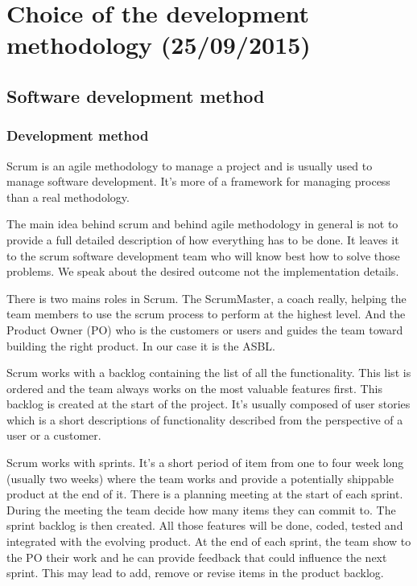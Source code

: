 \section{Choice of the development methodology (25/09/2015)}

\subsection{Software development method}

\subsubsection{Development method}
Scrum is an agile methodology to manage a project and is usually used to manage software development. It's more of a framework for managing process than a real methodology.\newline

The main idea behind scrum and behind agile methodology in general is not to provide a full detailed description of how everything has to be done. It leaves it to the scrum software development team who will know best how to solve those problems. We speak about the desired outcome not the implementation details.\newline

There is two mains roles in Scrum. The ScrumMaster, a coach really, helping the team members to use the scrum process to perform at the highest level. And the Product Owner (PO) who is the customers or users and guides the team toward building the right product. In our case it is the ASBL.\newline

Scrum works with a backlog containing the list of all the functionality. This list is ordered and the team always works on the most valuable features first. This backlog is created at the start of the project. It's usually composed of user stories which is a short descriptions of functionality described from the perspective of a user or a customer.\newline

Scrum works with sprints. It's a short period of item from one to four week long (usually two weeks) where the team works and provide a potentially shippable product at the end of it. There is a planning meeting at the start of each sprint. During the meeting the team decide how many items they can commit to. The sprint backlog is then created. All those features will be done, coded, tested and integrated with the evolving product. At the end of each sprint, the team show to the PO their work and he can provide feedback that could influence the next sprint. This may lead to add, remove or revise items in the product backlog.\newline


